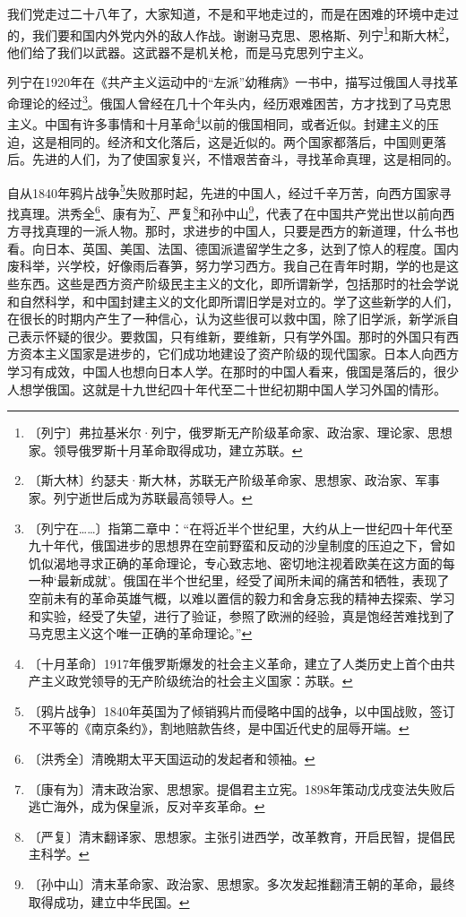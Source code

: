 \documentclass[12pt,UTF-8,openany]{ctexbook}
\begin{document}
\begin{large}
    
    我们党走过二十八年了，大家知道，不是和平地走过的，而是在困难的环境中走过的，我们要和国内外党内外的敌人作战。谢谢马克思、恩格斯、列宁\footnote{〔列宁〕弗拉基米尔·列宁，俄罗斯无产阶级革命家、政治家、理论家、思想家。领导俄罗斯十月革命取得成功，建立苏联。}和斯大林\footnote{〔斯大林〕约瑟夫·斯大林，苏联无产阶级革命家、思想家、政治家、军事家。列宁逝世后成为苏联最高领导人。}，他们给了我们以武器。这武器不是机关枪，而是马克思列宁主义。
    
    列宁在1920年在《共产主义运动中的“左派”幼稚病》一书中，描写过俄国人寻找革命理论的经过\footnote{〔列宁在……〕指第二章中：“在将近半个世纪里，大约从上一世纪四十年代至九十年代，俄国进步的思想界在空前野蛮和反动的沙皇制度的压迫之下，曾如饥似渴地寻求正确的革命理论，专心致志地、密切地注视着欧美在这方面的每一种‘最新成就’。俄国在半个世纪里，经受了闻所未闻的痛苦和牺牲，表现了空前未有的革命英雄气概，以难以置信的毅力和舍身忘我的精神去探索、学习和实验，经受了失望，进行了验证，参照了欧洲的经验，真是饱经苦难找到了马克思主义这个唯一正确的革命理论。”}。俄国人曾经在几十个年头内，经历艰难困苦，方才找到了马克思主义。中国有许多事情和十月革命\footnote{〔十月革命〕1917年俄罗斯爆发的社会主义革命，建立了人类历史上首个由共产主义政党领导的无产阶级统治的社会主义国家：苏联。}以前的俄国相同，或者近似。封建主义的压迫，这是相同的。经济和文化落后，这是近似的。两个国家都落后，中国则更落后。先进的人们，为了使国家复兴，不惜艰苦奋斗，寻找革命真理，这是相同的。
    
    自从1840年鸦片战争\footnote{〔鸦片战争〕1840年英国为了倾销鸦片而侵略中国的战争，以中国战败，签订不平等的《南京条约》，割地赔款告终，是中国近代史的屈辱开端。}失败那时起，先进的中国人，经过千辛万苦，向西方国家寻找真理。洪秀全\footnote{〔洪秀全〕清晚期太平天国运动的发起者和领袖。}、康有为\footnote{〔康有为〕清末政治家、思想家。提倡君主立宪。1898年策动戊戌变法失败后逃亡海外，成为保皇派，反对辛亥革命。}、严复\footnote{〔严复〕清末翻译家、思想家。主张引进西学，改革教育，开启民智，提倡民主科学。}和孙中山\footnote{〔孙中山〕清末革命家、政治家、思想家。多次发起推翻清王朝的革命，最终取得成功，建立中华民国。}，代表了在中国共产党出世以前向西方寻找真理的一派人物。那时，求进步的中国人，只要是西方的新道理，什么书也看。向日本、英国、美国、法国、德国派遣留学生之多，达到了惊人的程度。国内废科举，兴学校，好像雨后春笋，努力学习西方。我自己在青年时期，学的也是这些东西。这些是西方资产阶级民主主义的文化，即所谓新学，包括那时的社会学说和自然科学，和中国封建主义的文化即所谓旧学是对立的。学了这些新学的人们，在很长的时期内产生了一种信心，认为这些很可以救中国，除了旧学派，新学派自己表示怀疑的很少。要救国，只有维新，要维新，只有学外国。那时的外国只有西方资本主义国家是进步的，它们成功地建设了资产阶级的现代国家。日本人向西方学习有成效，中国人也想向日本人学。在那时的中国人看来，俄国是落后的，很少人想学俄国。这就是十九世纪四十年代至二十世纪初期中国人学习外国的情形。
    

\end{large}
\end{document}
